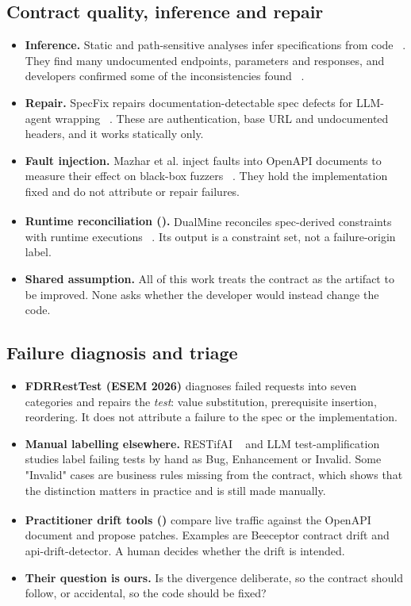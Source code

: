 \documentclass[acmsmall,screen,review,anonymous]{acmart}
\newcommand{\inferred}{\textsuperscript{\dag}}
\begin{document}
\subsection{Contract quality, inference and repair}
\begin{itemize}
\item \textbf{Inference.} Static and path-sensitive analyses infer specifications from code ~\cite{P018,P019}. They find many undocumented endpoints, parameters and responses, and developers confirmed some of the inconsistencies found ~\cite{P018}.
\item \textbf{Repair.} SpecFix repairs documentation-detectable spec defects for LLM-agent wrapping ~\cite{P032}. These are authentication, base URL and undocumented headers, and it works statically only.
\item \textbf{Fault injection.} Mazhar et al. inject faults into OpenAPI documents to measure their effect on black-box fuzzers ~\cite{arXiv2607_12101}. They hold the implementation fixed and do not attribute or repair failures.
\item \textbf{Runtime reconciliation (\inferred{}).} DualMine reconciles spec-derived constraints with runtime executions ~\cite{arXiv2609_27806}. Its output is a constraint set, not a failure-origin label.
\item \textbf{Shared assumption.} All of this work treats the contract as the artifact to be improved. None asks whether the developer would instead change the code.
\end{itemize}

\subsection{Failure diagnosis and triage}
\begin{itemize}
\item \textbf{FDRRestTest (ESEM 2026)} diagnoses failed requests into seven categories and repairs the \emph{test}: value substitution, prerequisite insertion, reordering. It does not attribute a failure to the spec or the implementation.
\item \textbf{Manual labelling elsewhere.} RESTifAI ~\cite{arXiv2512_08706} and LLM test-amplification studies label failing tests by hand as Bug, Enhancement or Invalid. Some "Invalid" cases are business rules missing from the contract, which shows that the distinction matters in practice and is still made manually.
\item \textbf{Practitioner drift tools (\inferred{})} compare live traffic against the OpenAPI document and propose patches. Examples are Beeceptor contract drift and api-drift-detector. A human decides whether the drift is intended.
\item \textbf{Their question is ours.} Is the divergence deliberate, so the contract should follow, or accidental, so the code should be fixed?
\end{itemize}
\end{document}
